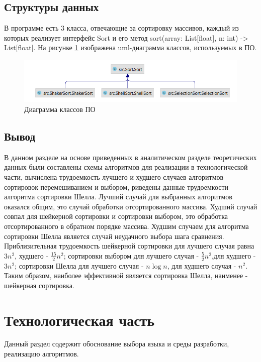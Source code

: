 \documentclass[12pt]{report}
\begin{document}
    \section{Структуры данных}
    В программе есть 3 класса, отвечающие за сортировку массивов, каждый из которых
    реализует интерфейс Sort и его метод sort(array: List[float], n: int) -> List[float].
    На рисунке \ref{fig:uml} изображена uml-диаграмма классов, используемых в ПО.
    
    \begin{figure}[H]
    	\centering
    	\includegraphics[width=0.85\linewidth]{img/uml}
    	\caption{Диаграмма классов ПО}
    	\label{fig:uml}
    \end{figure}

    \section{Вывод}
    В данном разделе на основе приведенных в аналитическом разделе теоретических данных
    были составлены схемы алгоритмов для реализации в технологической части,
    вычислена трудоемкость лучшего и худшего случаев алгоритмов сортировок перемешиванием и выбором,
    риведены данные трудоемкости алгоритма сортировки Шелла.
    Лучший случай для выбранных алгоритмов оказался общим, это случай обработки отсортированного массива.
    Худший случай совпал для шейкерной сортировки и сортировки выбором,
    это обработка отсортированного в обратном порядке массива.
    Худшим случаем для алгоритма сортировки Шелла является случай неудачного выбора шага сравнения.
    Приблизительная трудоемкость шейкерной сортировки для лучшего случая равна $3n^2$,
    худшего - $\frac{15}{2}n^2$; сортировки выбором для лучшего случая - $\frac{5}{2}n^2$,для худшего - $3n^2$;
    сортировки Шелла для лучшего случая - $n \log n$, для худшего случая - $n^2$.
    Таким образом, наиболее эффективной является сортировка Шелла, наименее - шейкерная сортировка.
    \newpage


    \chapter{Технологическая часть}
    Данный раздел содержит обоснование выбора языка и среды разработки, реализацию алгоритмов.
\end{document}
